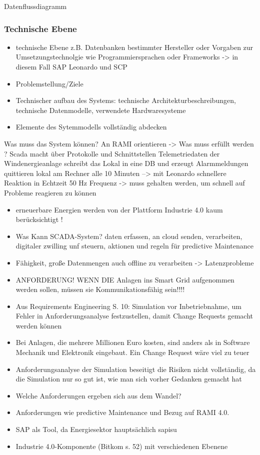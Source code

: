 Datenflussdiagramm
\subsubsection{Technische Ebene}

\begin{itemize}
  \item technische Ebene z.B. Datenbanken bestimmter Hersteller oder Vorgaben zur Umsetzungstechnolgie wie Programmiersprachen oder Frameworks -> in diesem Fall SAP Leonardo und SCP
  \item Problemstellung/Ziele
  \item Technischer aufbau des Systems: technische Architekturbeschreibungen, technische Datenmodelle, verwendete Hardwaresysteme
  \item Elemente des Sytemmodells vollständig abdecken
\end{itemize}



Was muss das System können? An RAMI orientieren -> Was muss erfüllt werden ?
Scada macht über Protokolle und Schnittstellen Telemetriedaten der Windenergieanlage
schreibt das Lokal in eine DB und erzeugt Alarmmeldungen
quittieren lokal am Rechner
alle 10 Minuten --> mit Leonardo schnellere Reaktion in Echtzeit
50 Hz Frequenz -> muss gehalten werden, um schnell auf Probleme reagieren zu können


\begin{itemize}
  \item erneuerbare Energien werden von der Plattform Industrie 4.0 kaum berücksichtigt !
  \item Was Kann SCADA-System? daten erfassen, an cloud senden, verarbeiten, digitaler zwilling unf steuern, aktionen und regeln für predictive Maintenance
  \item Fähigkeit, große Datenmengen auch offline zu verarbeiten -> Latenzprobleme
  \item ANFORDERUNG! WENN DIE Anlagen ins Smart Grid aufgenommen werden sollen, müssen sie Kommunikationsfähig sein!!!!
  \item Aus Requirements Engineering S. 10: Simulation vor Inbetriebnahme, um Fehler in Anforderungsanalyse festzustellen, damit Change Requests gemacht werden können
  \item Bei Anlagen, die mehrere Millionen Euro kosten, sind anders als in Software Mechanik und Elektronik eingebaut. Ein Change Request wäre viel zu teuer
  \item Anforderungsanalyse der Simulation beseitigt die Risiken nicht vollständig, da die Simulation nur so gut ist, wie man sich vorher Gedanken gemacht hat
  \item Welche Anforderungen ergeben sich aus dem Wandel?
  \item Anforderungen wie predictive Maintenance und Bezug auf RAMI 4.0.
  \item SAP als Tool, da Energiesektor hauptsächlich \acf{sapisu}
  \item Industrie 4.0-Komponente (Bitkom s. 52) mit verschiedenen Ebenene
\end{itemize}

